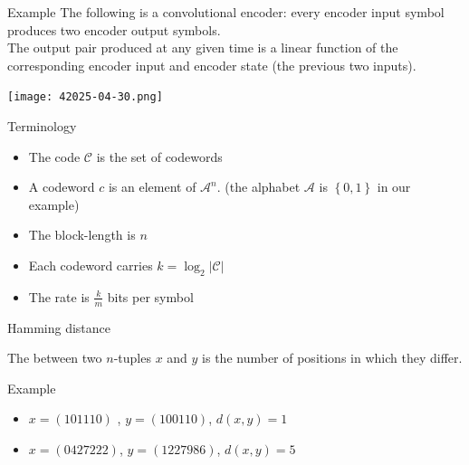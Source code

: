 \begin{parag}{Example}
    The following is a convolutional encoder: every encoder input symbol produces two encoder output symbols.\\
    The output pair produced at any given time is a linear function of the corresponding encoder input and encoder state (the previous two inputs).
    \begin{center}
        \texttt{[image: 42025-04-30.png]}
    \end{center}
    

    
\end{parag}
\begin{parag}{Terminology}
    \begin{itemize}
        \item The code $\mathcal{C}$ is the set of codewords 
        \item A codeword $c$ is an element of $\mathcal{A}^n$. (the alphabet $\mathcal{A}$ is $\left\{0, 1\right\}$ in our example)
        \item The block-length is $n$
        \item Each codeword carries $k = \log_2\left|\mathcal{C}\right|$
        \item The rate is $\frac{k}{m}$ bits per symbol
    \end{itemize}
    
    
\end{parag}
\begin{parag}{Hamming distance}
    \begin{definition}
    The  between two $n$-tuples $x$ and $y$ is the number of positions in which they differ.
    \end{definition}
    \begin{subparag}{Example}
        \begin{itemize}
            \item $x = \left(101110\right)$ ,  $y = \left(100110\right)$, $d\left(x, y\right) = 1$
            \item $x = \left(0427222\right)$, $y = \left(1227986\right)$, $d\left(x, y\right) = 5$
        \end{itemize}
        
        
    \end{subparag}
    
\end{parag}
















